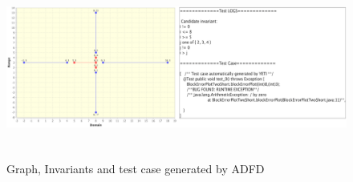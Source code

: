 \documentclass[runningheads,a4paper]{llncs}
\begin{document}
\begin{figure}[H]
\centering
\includegraphics[width= 12.5cm,height=6cm]{adfdCombined.png}
\caption{Graph, Invariants and test case generated by ADFD}
\label{fig:ADFD}
\end{figure}














\end{document}
